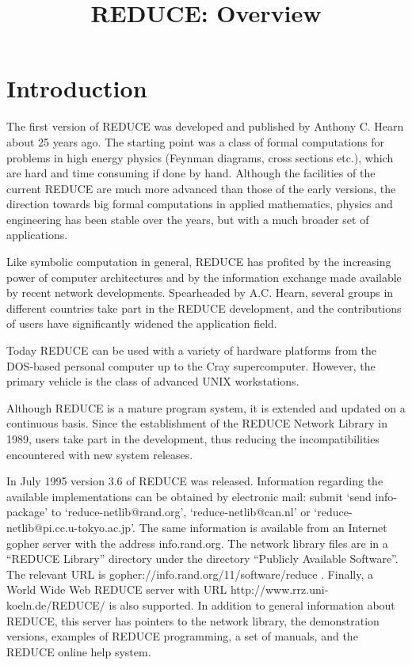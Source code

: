  \newcommand{\REDUCE}{REDUCE}
\author{}
\date{}
\title{REDUCE: Overview}

\sloppy
\maketitle

\section*{Introduction}
The first version of {\small REDUCE} was developed and published by
Anthony C.  Hearn about 25 years ago.  The starting point was a class of
formal computations for problems in high energy physics (Feynman diagrams,
cross sections etc.), which are hard and time consuming if done by hand.
Although the facilities of the current {\small REDUCE} are much more
advanced than those of the early versions, the direction towards big
formal computations in applied mathematics, physics and engineering has
been stable over the years, but with a much broader set of applications.

Like symbolic computation in general, {\small REDUCE} has profited by the
increasing power of computer architectures and by the information exchange
made available by recent network developments.  Spearheaded by A.C.
Hearn, several groups in different countries take part in the {\small
REDUCE} development, and the contributions of users have significantly
widened the application field.

Today {\small REDUCE} can be used with a variety of hardware platforms
from the {\small DOS}-based personal computer up to the Cray
supercomputer.  However, the primary vehicle is the class of advanced UNIX
workstations.

Although {\small REDUCE} is a mature program system, it is extended and
updated on a continuous basis.  Since the establishment of the {\small
REDUCE} Network Library in 1989, users take part in the development, thus
reducing the incompatibilities encountered with new system releases.

In July 1995 version 3.6 of {\small REDUCE} was released.  Information
regarding the available implementations can be obtained by electronic
mail: submit `send info-package' to `reduce-netlib@rand.org',
`reduce-netlib@can.nl' or
`reduce-netlib@pi.cc.u-tokyo.ac.jp'.
The same information is available from an Internet gopher server with
the address info.rand.org.  The network library files are in a ``REDUCE
Library'' directory under the directory ``Publicly Available Software''.
The relevant URL is gopher://info.rand.org/11/software/reduce .  Finally,
a World Wide Web {\REDUCE} server with URL http://www.rrz.uni-koeln.de/REDUCE/
is also supported.  In addition to general information about {\REDUCE}, this
server has pointers to the network library, the demonstration versions,
examples of {\REDUCE} programming, a set of manuals, and the {\REDUCE} online
help system.

